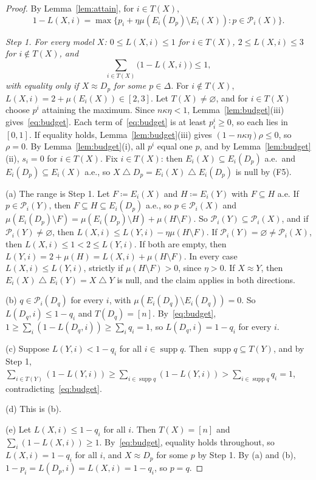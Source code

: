 \documentclass[11pt]{article}
\theoremstyle{definition}
\newcommand{\supp}{\operatorname{supp}}
\newcommand{\Pc}{\mathcal P}
\newcommand{\sd}{\mathbin{\triangle}}
\begin{document}
\begin{proof}
By Lemma~\ref{lem:attain}, for $i\in T(X)$,
\[
1-L(X,i)=\max\{p_i+\eta\mu(E_i(D_p)\setminus E_i(X)):p\in\Pc_i(X)\}.
\]

\emph{Step 1. For every model $X$: $0\le L(X,i)\le1$ for $i\in T(X)$, $2\le L(X,i)\le3$ for $i\notin T(X)$, and}
\begin{equation}\label{eq:budget}
\sum_{i\in T(X)}\big(1-L(X,i)\big)\le1,
\end{equation}
\emph{with equality only if $X\approx D_p$ for some $p\in\Delta$.} For $i\notin T(X)$, $L(X,i)=2+\mu(E_i(X))\in[2,3]$. Let $T(X)\ne\varnothing$, and for $i\in T(X)$ choose $p^i$ attaining the maximum. Since $n\kappa\eta<1$, Lemma~\ref{lem:budget}(iii) gives~\eqref{eq:budget}. Each term of~\eqref{eq:budget} is at least $p^i_i\ge0$, so each lies in $[0,1]$. If equality holds, Lemma~\ref{lem:budget}(iii) gives $(1-n\kappa\eta)\rho\le0$, so $\rho=0$. By Lemma~\ref{lem:budget}(i), all $p^i$ equal one $p$, and by Lemma~\ref{lem:budget}(ii), $s_i=0$ for $i\in T(X)$. Fix $i\in T(X)$: then $E_i(X)\subseteq E_i(D_p)$ a.e.\ and $E_i(D_p)\subseteq E_i(X)$ a.e., so $X\sd D_p=E_i(X)\sd E_i(D_p)$ is null by (F5).

(a) The range is Step 1. Let $F\coloneqq E_i(X)$ and $H\coloneqq E_i(Y)$ with $F\subseteq H$ a.e. If $p\in\Pc_i(Y)$, then $F\subseteq H\subseteq E_i(D_p)$ a.e., so $p\in\Pc_i(X)$ and $\mu(E_i(D_p)\setminus F)=\mu(E_i(D_p)\setminus H)+\mu(H\setminus F)$. So $\Pc_i(Y)\subseteq\Pc_i(X)$, and if $\Pc_i(Y)\ne\varnothing$, then $L(X,i)\le L(Y,i)-\eta\mu(H\setminus F)$. If $\Pc_i(Y)=\varnothing\ne\Pc_i(X)$, then $L(X,i)\le1<2\le L(Y,i)$. If both are empty, then $L(Y,i)=2+\mu(H)=L(X,i)+\mu(H\setminus F)$. In every case $L(X,i)\le L(Y,i)$, strictly if $\mu(H\setminus F)>0$, since $\eta>0$. If $X\approx Y$, then $E_i(X)\sd E_i(Y)=X\sd Y$ is null, and the claim applies in both directions.

(b) $q\in\Pc_i(D_q)$ for every $i$, with $\mu(E_i(D_q)\setminus E_i(D_q))=0$. So $L(D_q,i)\le1-q_i$ and $T(D_q)=[n]$. By~\eqref{eq:budget}, $1\ge\sum_i(1-L(D_q,i))\ge\sum_iq_i=1$, so $L(D_q,i)=1-q_i$ for every $i$.

(c) Suppose $L(Y,i)<1-q_i$ for all $i\in\supp q$. Then $\supp q\subseteq T(Y)$, and by Step 1, $\sum_{i\in T(Y)}(1-L(Y,i))\ge\sum_{i\in\supp q}(1-L(Y,i))>\sum_{i\in\supp q}q_i=1$, contradicting~\eqref{eq:budget}.

(d) This is (b).

(e) Let $L(X,i)\le1-q_i$ for all $i$. Then $T(X)=[n]$ and $\sum_i(1-L(X,i))\ge1$. By~\eqref{eq:budget}, equality holds throughout, so $L(X,i)=1-q_i$ for all $i$, and $X\approx D_p$ for some $p$ by Step 1. By (a) and (b), $1-p_i=L(D_p,i)=L(X,i)=1-q_i$, so $p=q$.


\end{proof}
\end{document}
